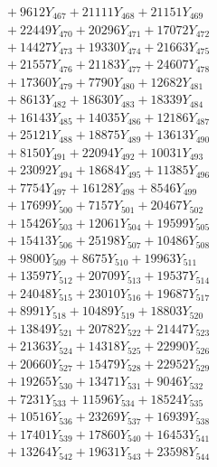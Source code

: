 \documentclass[a4paper,10pt]{article}
\begin{document}
{\begin{align}
&\;  + 9612 Y_{467} + 21111 Y_{468} + 21151 Y_{469} \\[0.3ex]
&\;  + 22449 Y_{470} + 20296 Y_{471} + 17072 Y_{472} \\[0.3ex]
&\;  + 14427 Y_{473} + 19330 Y_{474} + 21663 Y_{475} \\[0.3ex]
&\;  + 21557 Y_{476} + 21183 Y_{477} + 24607 Y_{478} \\[0.5ex]\allowbreak
&\;  + 17360 Y_{479} + 7790 Y_{480} + 12682 Y_{481} \\[0.3ex]
&\;  + 8613 Y_{482} + 18630 Y_{483} + 18339 Y_{484} \\[0.3ex]
&\;  + 16143 Y_{485} + 14035 Y_{486} + 12186 Y_{487} \\[0.3ex]
&\;  + 25121 Y_{488} + 18875 Y_{489} + 13613 Y_{490} \\[0.3ex]
&\;  + 8150 Y_{491} + 22094 Y_{492} + 10031 Y_{493} \\[0.3ex]
&\;  + 23092 Y_{494} + 18684 Y_{495} + 11385 Y_{496} \\[0.3ex]
&\;  + 7754 Y_{497} + 16128 Y_{498} + 8546 Y_{499} \\[0.3ex]
&\;  + 17699 Y_{500} + 7157 Y_{501} + 20467 Y_{502} \\[0.3ex]
&\;  + 15426 Y_{503} + 12061 Y_{504} + 19599 Y_{505} \\[0.3ex]
&\;  + 15413 Y_{506} + 25198 Y_{507} + 10486 Y_{508} \\[0.5ex]\allowbreak
&\;  + 9800 Y_{509} + 8675 Y_{510} + 19963 Y_{511} \\[0.3ex]
&\;  + 13597 Y_{512} + 20709 Y_{513} + 19537 Y_{514} \\[0.3ex]
&\;  + 24048 Y_{515} + 23010 Y_{516} + 19687 Y_{517} \\[0.3ex]
&\;  + 8991 Y_{518} + 10489 Y_{519} + 18803 Y_{520} \\[0.3ex]
&\;  + 13849 Y_{521} + 20782 Y_{522} + 21447 Y_{523} \\[0.3ex]
&\;  + 21363 Y_{524} + 14318 Y_{525} + 22990 Y_{526} \\[0.3ex]
&\;  + 20660 Y_{527} + 15479 Y_{528} + 22952 Y_{529} \\[0.3ex]
&\;  + 19265 Y_{530} + 13471 Y_{531} + 9046 Y_{532} \\[0.3ex]
&\;  + 7231 Y_{533} + 11596 Y_{534} + 18524 Y_{535} \\[0.3ex]
&\;  + 10516 Y_{536} + 23269 Y_{537} + 16939 Y_{538} \\[0.5ex]\allowbreak
&\;  + 17401 Y_{539} + 17860 Y_{540} + 16453 Y_{541} \\[0.3ex]
&\;  + 13264 Y_{542} + 19631 Y_{543} + 23598 Y_{544} \\[0.3ex]

\end{align}}
\end{document}
